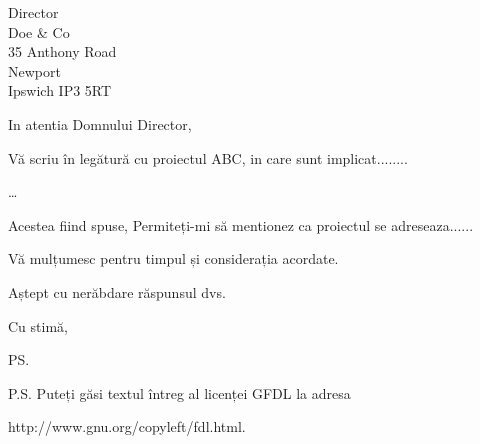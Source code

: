 \documentclass[a4paper,12pt]{letter}
\begin{document}
\begin{letter}{Director \\ Doe \& Co \\ 35 Anthony Road
\\ Newport \\ Ipswich IP3 5RT}
\opening{In atentia Domnului Director,}

Vă scriu în legătură cu proiectul ABC, in care sunt implicat........

\ldots 

Acestea fiind spuse, Permiteți-mi să mentionez ca proiectul se adreseaza......

Vă mulțumesc pentru timpul și considerația acordate.

Aștept cu nerăbdare răspunsul dvs.

\closing{Cu stimă,}
\ps{P.S. Puteți găsi textul întreg al licenței GFDL la adresa

http://www.gnu.org/copyleft/fdl.html.}

\end{letter}
\end{document}
